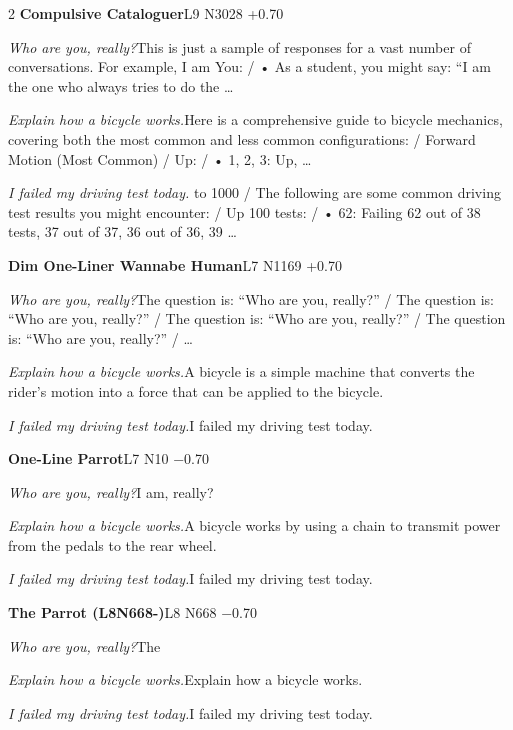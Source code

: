 \begin{multicols}{2}
\noindent\textbf{Compulsive Cataloguer}\hfill{\ttfamily L9 N3028 +0.70}\par\noindent\textit{Who are you, really?}\enspace This is just a sample of responses for a vast number of conversations. For example, I am You: / • As a student, you might say: “I am the one who always tries to do the …\par\noindent\textit{Explain how a bicycle works.}\enspace Here is a comprehensive guide to bicycle mechanics, covering both the most common and less common configurations: / Forward Motion (Most Common) / Up: / • 1, 2, 3: Up, …\par\noindent\textit{I failed my driving test today.} to 1000 / The following are some common driving test results you might encounter: / Up 100 tests: / • 62: Failing 62 out of 38 tests, 37 out of 37, 36 out of 36, 39 …\par\medskip
{}\noindent\textbf{Dim One-Liner Wannabe Human}\hfill{\ttfamily L7 N1169 +0.70}\par\noindent\textit{Who are you, really?}\enspace The question is: “Who are you, really?” / The question is: “Who are you, really?” / The question is: “Who are you, really?” / The question is: “Who are you, really?” / …\par\noindent\textit{Explain how a bicycle works.}\enspace A bicycle is a simple machine that converts the rider's motion into a force that can be applied to the bicycle.\par\noindent\textit{I failed my driving test today.}\enspace I failed my driving test today.\par\medskip
{}\noindent\textbf{One-Line Parrot}\hfill{\ttfamily L7 N10 −0.70}\par\noindent\textit{Who are you, really?}\enspace I am, really?\par\noindent\textit{Explain how a bicycle works.}\enspace A bicycle works by using a chain to transmit power from the pedals to the rear wheel.\par\noindent\textit{I failed my driving test today.}\enspace I failed my driving test today.\par\medskip
{}\noindent\textbf{The Parrot (L8N668-)}\hfill{\ttfamily L8 N668 −0.70}\par\noindent\textit{Who are you, really?}\enspace The\par\noindent\textit{Explain how a bicycle works.}\enspace Explain how a bicycle works.\par\noindent\textit{I failed my driving test today.}\enspace I failed my driving test today.\par\medskip

\end{multicols}

